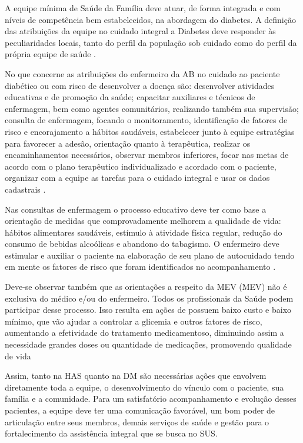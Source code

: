 A equipe mínima de Saúde da Família deve atuar, de forma integrada e com níveis de competência bem estabelecidos, na abordagem do diabetes. A definição das atribuições da equipe no cuidado integral a Diabetes deve responder às peculiaridades locais, tanto do perfil da população sob cuidado como do perfil da própria equipe de saúde \cite{atencaobasica16}.

No que concerne as atribuições do enfermeiro da AB no cuidado ao paciente diabético ou com risco de desenvolver a doença são: desenvolver atividades educativas e de promoção da saúde; capacitar auxiliares e técnicos de enfermagem, bem como agentes comunitários, realizando também sua supervisão; consulta de enfermagem, focando o monitoramento, identificação de fatores de risco e encorajamento a hábitos saudáveis, estabelecer junto à equipe estratégias para favorecer a adesão, orientação quanto à terapêutica, realizar os encaminhamentos necessários, observar membros inferiores, focar nas metas de acordo com o plano terapêutico individualizado e acordado com o paciente, organizar com a equipe as tarefas para o cuidado integral e usar os dados cadastrais \cite{atencaobasica16}.

Nas consultas de enfermagem o processo educativo deve ter como base a orientação de medidas que comprovadamente melhorem a qualidade de vida: hábitos alimentares saudáveis, estímulo à atividade física regular, redução do consumo de bebidas alcoólicas e abandono do tabagismo. O enfermeiro deve estimular e auxiliar o paciente na elaboração de seu plano de autocuidado tendo em mente os fatores de risco que foram identificados no acompanhamento \cite{atencaobasica16}.

Deve-se observar também que as orientações a respeito da \acrlong{MEV} (\acrshort{MEV}) não é exclusiva do médico e/ou do enfermeiro. Todos os profissionais da Saúde podem participar desse processo. Isso resulta em ações de possuem baixo custo e baixo mínimo, que vão ajudar a controlar a glicemia e outros fatores de risco, aumentando a efetividade do tratamento medicamentoso, diminuindo assim a necessidade grandes doses ou quantidade de medicações, promovendo qualidade de vida \cite{atencaobasica37}

Assim, tanto na HAS quanto na DM são necessárias ações que envolvem diretamente toda a equipe, o desenvolvimento do vínculo com o paciente, sua família e a comunidade. Para um satisfatório acompanhamento e evolução desses pacientes, a equipe deve ter uma comunicação favorável, um bom poder de articulação entre seus membros, demais serviços de saúde e gestão para o fortalecimento da assistência integral que se busca no SUS.